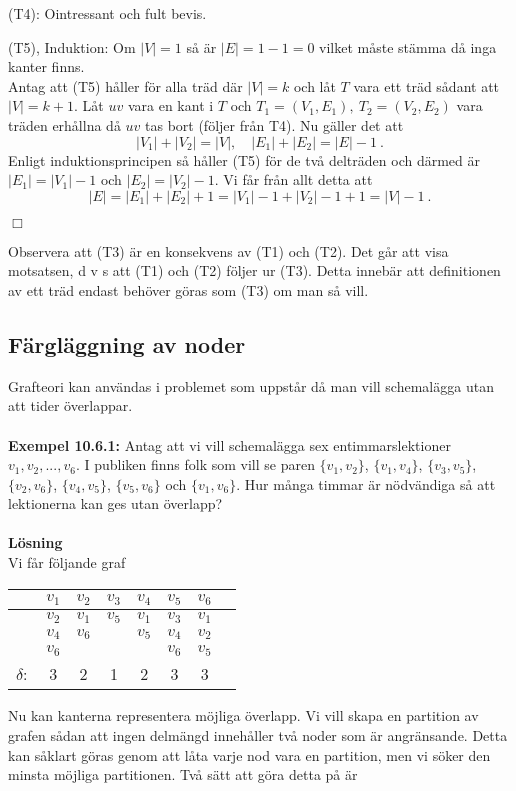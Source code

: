 \documentclass{article}
\begin{document}
(T4): Ointressant och fult bevis.

(T5), Induktion: Om $|V|=1$ så är $|E|=1-1=0$ vilket måste stämma då inga kanter finns.\\
Antag att (T5) håller för alla träd där $|V|=k$ och låt $T$ vara ett träd sådant att $|V|=k+1$. Låt $uv$ vara en kant i $T$ och $T_1=(V_1,E_1), \ T_2=(V_2,E_2)$ vara träden erhållna då $uv$ tas bort (följer från T4). Nu gäller det att
$$
|V_1|+|V_2|=|V|, \quad |E_1|+|E_2|=|E|-1 \ .
$$
Enligt induktionsprincipen så håller (T5) för de två delträden och därmed är
$|E_1|=|V_1|-1$ och $|E_2|=|V_2|-1$. Vi får från allt detta att
$$
|E|=|E_1|+|E_2|+1=|V_1|-1+|V_2|-1+1=|V|-1 \ .
$$
\begin{flushright}
$\Box$
\end{flushright}
Observera att (T3) är en konsekvens av (T1) och (T2). Det går att visa motsatsen, d v s att (T1) och (T2) följer ur (T3). Detta innebär att definitionen av ett träd endast behöver göras som (T3) om man så vill.

\subsection{Färgläggning av noder}
Grafteori kan användas i problemet som uppstår då man vill schemalägga utan att tider överlappar.\\ \\
\textbf{Exempel 10.6.1:} Antag att vi vill schemalägga sex entimmarslektioner $v_1,v_2,...,v_6$. I publiken finns folk som vill se paren $\{v_1,v_2\}$, $\{v_1,v_4\}$, $\{v_3,v_5\}$, $\{v_2,v_6\}$, $\{v_4,v_5\}$, $\{v_5,v_6\}$ och $\{v_1,v_6\}$. Hur många timmar är nödvändiga så att lektionerna kan ges utan överlapp?\\ \\
\textbf{Lösning}\\
Vi får följande graf
\begin{center}
\begin{tabular}{l*{6}{c}r}
 & $v_1$ & $v_2$ & $v_3$ & $v_4$ & $v_5$ & $v_6$\\
\hline
 & $v_2$ & $v_1$ & $v_5$ & $v_1$ & $v_3$ & $v_1$\\
 & $v_4$ & $v_6$ &  & $v_5$ & $v_4$ & $v_2$\\
 & $v_6$ &  &  &  & $v_6$ & $v_5$ \\
\hline
$\delta:$ & 3 & 2 & 1 & 2 & 3 & 3
\end{tabular}
\end{center}
Nu kan kanterna representera möjliga överlapp. Vi vill skapa en partition av grafen sådan att ingen delmängd innehåller två noder som är angränsande. Detta kan såklart göras genom att låta varje nod vara en partition, men vi söker den minsta möjliga partitionen. Två sätt att göra detta på är\\
\end{document}
